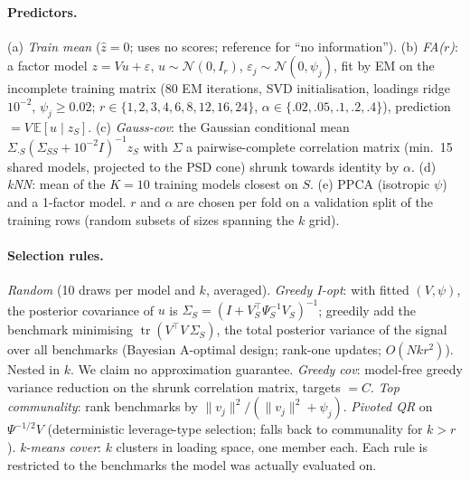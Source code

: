 \documentclass{article}
\newcommand{\E}{\mathbb{E}}
\newcommand{\tr}{\operatorname{tr}}
\begin{document}
\paragraph{Predictors.} (a) \emph{Train mean} ($\hat z=0$; uses no scores; reference for ``no information''). (b) \emph{FA($r$)}: a factor model $z=Vu+\varepsilon$, $u\sim\mathcal N(0,I_r)$, $\varepsilon_j\sim\mathcal N(0,\psi_j)$, fit by EM on the incomplete training matrix (80 EM iterations, SVD initialisation, loadings ridge $10^{-2}$, $\psi_j\ge0.02$; $r\in\{1,2,3,4,6,8,12,16,24\}$, $\alpha\in\{.02,.05,.1,.2,.4\}$), prediction $=V\,\E[u\mid z_S]$. (c) \emph{Gauss-cov}: the Gaussian conditional mean $\Sigma_{\cdot S}(\Sigma_{SS}+10^{-2}I)^{-1}z_S$ with $\Sigma$ a pairwise-complete correlation matrix (min.\ 15 shared models, projected to the PSD cone) shrunk towards identity by $\alpha$. (d) \emph{kNN}: mean of the $K{=}10$ training models closest on $S$. (e) PPCA (isotropic $\psi$) and a 1-factor model. $r$ and $\alpha$ are chosen per fold on a validation split of the training rows (random subsets of sizes spanning the $k$ grid).

\paragraph{Selection rules.} \emph{Random} (10 draws per model and $k$, averaged). \emph{Greedy I-opt}: with fitted $(V,\psi)$, the posterior covariance of $u$ is $\Sigma_S=(I+V_S^\top\Psi_S^{-1}V_S)^{-1}$; greedily add the benchmark minimising $\tr(V^\top V\,\Sigma_S)$, the total posterior variance of the signal over all benchmarks (Bayesian A-optimal design; rank-one updates; $O(Nkr^2)$). Nested in $k$. We claim no approximation guarantee. \emph{Greedy cov}: model-free greedy variance reduction on the shrunk correlation matrix, targets $=C$. \emph{Top communality}: rank benchmarks by $\|v_j\|^2/(\|v_j\|^2+\psi_j)$. \emph{Pivoted QR} on $\Psi^{-1/2}V$ (deterministic leverage-type selection; falls back to communality for $k>r$). \emph{k-means cover}: $k$ clusters in loading space, one member each. Each rule is restricted to the benchmarks the model was actually evaluated on.
\end{document}
